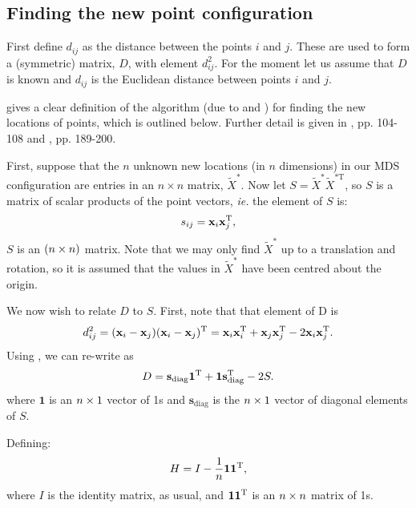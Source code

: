 \subsection{Finding the new point configuration}

First define $d_{ij}$ as the distance between the points $i$ and $j$. These are used to form a (symmetric) matrix, $D$, with \ijth element $d^2_{ij}$. For the moment let us assume that $D$ is known and $d_{ij}$ is the Euclidean distance between points $i$ and $j$. 

\cite{diaconis08} gives a clear definition of the algorithm (due to \cite{schoenberg35} and \cite{torgerson}) for finding the new locations of points, which is outlined below. Further detail is given in \cite{principlesofMA}, pp. 104-108 and \cite{chatfieldcollins}, pp. 189-200.

First, suppose that the $n$ unknown new locations (in $n$ dimensions) in our MDS configuration are entries in an $n \times n$ matrix, $\tilde{X}^*$. Now let $S=\tilde{X}^{*} \tilde{X}^{*\text{T}} $, so $S$ is a matrix of scalar products of the point vectors, \emph{ie.} the \ijth element of $S$ is:
\begin{equation}
s_{ij} = \mathbf{x}_i\mathbf{x}_j^{\text{T}},
\label{selem}
\end{equation}
$S$ is an $(n\times n)$ matrix. Note that we may only find $\tilde{X}^*$ up to a translation and rotation, so it is assumed that the values in $\tilde{X}^*$ have been centred about the origin.

We now wish to relate $D$ to $S$. First, note that that \ijth element of D is 
\begin{equation}
d_{ij}^2 = (\mathbf{x}_i-\mathbf{x}_j)(\mathbf{x}_i-\mathbf{x}_j)^{\text{T}} = \mathbf{x}_i\mathbf{x}_i^{\text{T}} + \mathbf{x}_j\mathbf{x}_j^{\text{T}}  -2 \mathbf{x}_i\mathbf{x}_j^{\text{T}}.
\label{dij}
\end{equation}
Using , we can re-write  as
\begin{equation}
D=\mathbf{s}_\text{diag}\mathbf{1}^{\text{T}} + \mathbf{1}\mathbf{s}_\text{diag}^{\text{T}} -2S.
\label{dijmat}
\end{equation}
where $\mathbf{1}$ is an $n \times 1$ vector of 1s and $\mathbf{s}_\text{diag}$ is the $n \times 1$ vector of diagonal elements of $S$.

Defining:
\begin{equation}
H = I-\frac{1}{n}\mathbf{1}\mathbf{1}^{\text{T}},
\end{equation}
where $I$ is the identity matrix, as usual, and $\mathbf{1}\mathbf{1}^{\text{T}}$ is an $n \times n$ matrix of 1s.

